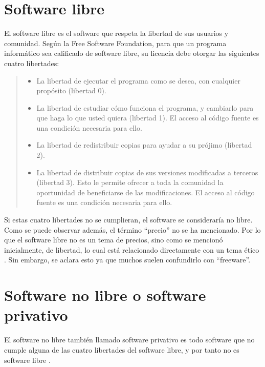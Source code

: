 \documentclass[a4paper,openright,12pt]{report}
\begin{document}
\section{Software libre}
El software libre es el software que respeta la libertad de sus usuarios y
comunidad. Según la Free Software Foundation, para que un programa
informático sea calificado de software libre, su licencia debe otorgar las
siguientes cuatro libertades:
\begin{framed}
\begin{quote}
\begin{itemize}
\item La libertad de ejecutar el programa como se desea, con cualquier propósito
(libertad 0).
\item La libertad de estudiar cómo funciona el programa, y cambiarlo para que
haga lo que usted quiera (libertad 1). El acceso al código fuente es una condición
necesaria para ello.
\item La libertad de redistribuir copias para ayudar a su prójimo (libertad 2).
\item La libertad de distribuir copias de sus versiones modificadas a terceros
(libertad 3). Esto le permite ofrecer a toda la comunidad la oportunidad de
beneficiarse de las modificaciones. El acceso al código fuente es una condición
necesaria para ello.
\end{itemize}
\raggedleft\cite{cuatroLibertades}
\end{quote}
\end{framed}
Si estas cuatro libertades no se cumplieran, el software se consideraría no
libre. Como se puede observar además, el término “precio” no se ha mencionado.
Por lo que el software libre no es un tema de precios, sino como se mencionó
inicialmente, de libertad, lo cual está relacionado directamente con un tema
ético \cite{cuatroLibertades}. Sin embargo, se aclara esto ya que muchos suelen
confundirlo con “freeware”.
\section{Software no libre o software privativo}
El software no libre también llamado software privativo es todo software que no
cumple alguna de las cuatro libertades del software libre, y por tanto no es
software libre \cite{gnuCategories}.
\end{document}
